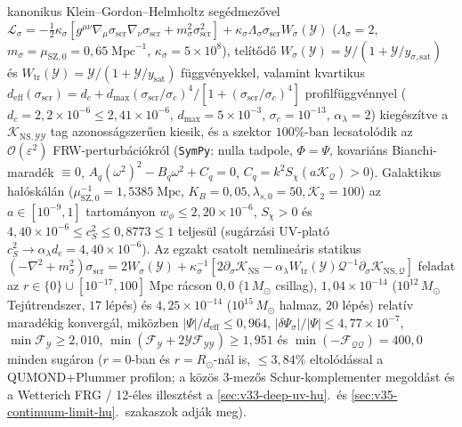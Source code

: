 \documentclass[11pt,a4paper]{article}
\begin{document}
{\begin{enumerate}
kanonikus Klein--Gordon--Helmholtz segédmezővel $\mathcal{L}_\sigma = -\frac{1}{2}\kappa_\sigma[g^{\mu\nu}\nabla_\mu\sigma_{\mathrm{scr}}\nabla_\nu\sigma_{\mathrm{scr}} + m_\sigma^2\sigma_{\mathrm{scr}}^2] + \kappa_\sigma\Lambda_\sigma\sigma_{\mathrm{scr}}W_\sigma(\mathcal{Y})$ ($\Lambda_\sigma=2$, $m_\sigma=\mu_{\mathrm{SZ},0}=0{,}65\;\mathrm{Mpc}^{-1}$, $\kappa_\sigma=5\times 10^8$), telítődő $W_\sigma(\mathcal{Y})=\mathcal{Y}/(1+\mathcal{Y}/y_{\sigma,\mathrm{sat}})$ és $W_{\mathrm{tr}}(\mathcal{Y})=\mathcal{Y}/(1+\mathcal{Y}/y_{\mathrm{sat}})$ függvényekkel, valamint kvartikus $d_{\mathrm{eff}}(\sigma_{\mathrm{scr}})=d_c+d_{\max}(\sigma_{\mathrm{scr}}/\sigma_c)^4/[1+(\sigma_{\mathrm{scr}}/\sigma_c)^4]$ profilfüggvénnyel ($d_c=2{,}2\times 10^{-6}\le 2{,}41\times 10^{-6}$, $d_{\max}=5\times 10^{-3}$, $\sigma_c=10^{-13}$, $\alpha_\lambda=2$) kiegészítve a $\mathcal{K}_{\mathrm{NS},\mathcal{Y}\mathcal{Y}}$ tag azonosságszerűen kiesik, és a szektor $100\%$-ban lecsatolódik az $\mathcal{O}(\varepsilon^2)$ FRW-perturbációkról (\texttt{SymPy}: nulla tadpole, $\Phi=\Psi$, kovariáns Bianchi-maradék $\equiv 0$, $A_q(\omega^2)^2-B_q\omega^2+C_q=0$, $C_q=k^2 S_\chi(a\mathcal{K}_{\mathcal{Q}})>0$). Galaktikus halóskálán ($\mu_{\mathrm{SZ},0}^{-1}=1{,}5385\;\mathrm{Mpc}$, $K_B=0{,}05, \lambda_{s,0}=50, \mathcal{K}_2=100$) az $a\in[10^{-9},1]$ tartományon $w_\phi\le 2{,}20\times 10^{-6}$, $S_\chi>0$ és $4{,}40\times 10^{-6}\le c_S^2\le 0{,}8773\le 1$ teljesül (sugárzási UV-plató $c_S^2\to \alpha_\lambda d_c = 4{,}40\times 10^{-6}$). Az egzakt csatolt nemlineáris statikus $(-\nabla^2+m_\sigma^2)\sigma_{\mathrm{scr}} = 2W_\sigma(\mathcal{Y}) + \kappa_\sigma^{-1}[2\partial_\sigma\mathcal{K}_{\mathrm{NS}} - \alpha_\lambda W_{\mathrm{tr}}(\mathcal{Y})\mathcal{Q}^{-1}\partial_\sigma\mathcal{K}_{\mathrm{NS},\mathcal{Q}}]$ feladat az $r\in\{0\}\cup[10^{-17},100]\;\mathrm{Mpc}$ rácson $0{,}0$ ($1\,M_\odot$ csillag), $1{,}04\times 10^{-14}$ ($10^{12}\,M_\odot$ Tejútrendszer, $17$ lépés) és $4{,}25\times 10^{-14}$ ($10^{15}\,M_\odot$ halmaz, $20$ lépés) relatív maradékig konvergál, miközben $|\Psi|/d_{\mathrm{eff}}\le 0{,}964$, $|\delta\Psi_\sigma|/|\Psi|\le 4{,}77\times 10^{-7}$, $\min\mathcal{F}_{\mathcal{Y}}\ge 2{,}010$, $\min(\mathcal{F}_{\mathcal{Y}}+2\mathcal{Y}\mathcal{F}_{\mathcal{Y}\mathcal{Y}})\ge 1{,}951$ és $\min(-\mathcal{F}_{\mathcal{Q}\mathcal{Q}})=400{,}0$ minden sugáron ($r=0$-ban és $r=R_\odot$-nál is, $\le 3{,}84\%$ eltolódással a QUMOND+Plummer profilon; a közös 3-mezős Schur-komplementer megoldást és a Wetterich FRG / 12-éles illesztést a \ref{sec:v33-deep-uv-hu}.~és \ref{sec:v35-continuum-limit-hu}.~szakaszok adják meg).

\end{enumerate}}
\end{document}
